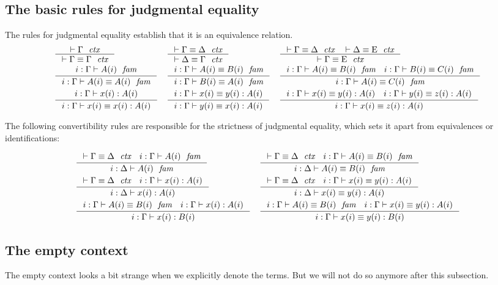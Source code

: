 \subsection{The basic rules for judgmental equality}
The rules for judgmental equality establish that it is an equivalence relation.
\bgroup\small
\begin{align*}
& \inference
  {\jvctx{\Gamma}}
  {\jvctxeq{\Gamma}{\Gamma}} 
& & \inference
    {\jvctxeq{\Gamma}{\Delta}}
    {\jvctxeq{\Delta}{\Gamma}} 
& & \inference
    {\jvctxeq{\Gamma}{\Delta}
     \jvctxeq{\Delta}{\greek{E}}}
    {\jvctxeq{\Gamma}{\greek{E}}}\\
& \inference
  {\jvfam{i}{\Gamma}{A}}
  {\jvfameq{i}{\Gamma}{A}{A}} 
& & \inference
    {\jvfameq{i}{\Gamma}{A}{B}}
    {\jvfameq{i}{\Gamma}{B}{A}}
& & \inference
    {\jvfameq{i}{\Gamma}{A}{B}
     \jvfameq{i}{\Gamma}{B}{C}}
    {\jvfameq{i}{\Gamma}{A}{C}}\\
& \inference
  {\jvterm{i}{\Gamma}{A}{x}}
  {\jvtermeq{i}{\Gamma}{A}{x}{x}}
& & \inference
    {\jvtermeq{i}{\Gamma}{A}{x}{y}}
    {\jvtermeq{i}{\Gamma}{A}{y}{x}}
& & \inference
    {\jvtermeq{i}{\Gamma}{A}{x}{y}
     \jvtermeq{i}{\Gamma}{A}{y}{z}}
    {\jvtermeq{i}{\Gamma}{A}{x}{z}}
\end{align*}
\egroup

The following convertibility rules are responsible for the strictness
of judgmental equality, which sets it apart from equivalences or identifications:

\begin{align*}
& \inference
  {\jvctxeq{\Gamma}{\Delta}
   \jvfam{i}{\Gamma}{A}}
  {\jvfam{i}{\Delta}{A}}
& & \inference
    {\jvctxeq{\Gamma}{\Delta}
     \jvfameq{i}{\Gamma}{A}{B}}
    {\jvfameq{i}{\Delta}{A}{B}}\\
& \inference
  {\jvctxeq{\Gamma}{\Delta}
   \jvterm{i}{\Gamma}{A}{x}}
  {\jvterm{i}{\Delta}{A}{x}}
& & \inference
    {\jvctxeq{\Gamma}{\Delta}
     \jvtermeq{i}{\Gamma}{A}{x}{y}}
    {\jvtermeq{i}{\Delta}{A}{x}{y}}\\
& \inference
  {\jvfameq{i}{\Gamma}{A}{B}
   \jvterm{i}{\Gamma}{A}{x}}
  {\jvterm{i}{\Gamma}{B}{x}}
& & \inference
    {\jvfameq{i}{\Gamma}{A}{B}
     \jvtermeq{i}{\Gamma}{A}{x}{y}}
    {\jvtermeq{i}{\Gamma}{B}{x}{y}}
\end{align*}

\subsection{The empty context}
The empty context looks a bit strange when we explicitly denote the terms. But
we will not do so anymore after this subsection.

